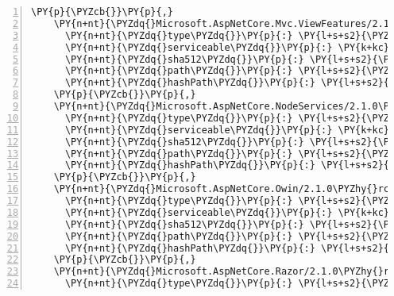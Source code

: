\begin{Verbatim}[commandchars=\\\{\},numbers=left,firstnumber=1,stepnumber=1,numberblanklines=0]
    \PY{p}{\PYZcb{}}\PY{p}{,}
    \PY{n+nt}{\PYZdq{}Microsoft.AspNetCore.Mvc.ViewFeatures/2.1.0\PYZhy{}rc1\PYZhy{}final\PYZdq{}}\PY{p}{:} \PY{p}{\PYZob{}}
      \PY{n+nt}{\PYZdq{}type\PYZdq{}}\PY{p}{:} \PY{l+s+s2}{\PYZdq{}package\PYZdq{}}\PY{p}{,}
      \PY{n+nt}{\PYZdq{}serviceable\PYZdq{}}\PY{p}{:} \PY{k+kc}{true}\PY{p}{,}
      \PY{n+nt}{\PYZdq{}sha512\PYZdq{}}\PY{p}{:} \PY{l+s+s2}{\PYZdq{}sha512\PYZhy{}f0Pb9qVStLdGgNNpw9O656mOPjgkfeUpaqJa4PLJow1Re+7l3ynFk3JoHuxg/epKdV0kpLyNPRS0TuCpg4vBJw==\PYZdq{}}\PY{p}{,}
      \PY{n+nt}{\PYZdq{}path\PYZdq{}}\PY{p}{:} \PY{l+s+s2}{\PYZdq{}microsoft.aspnetcore.mvc.viewfeatures/2.1.0\PYZhy{}rc1\PYZhy{}final\PYZdq{}}\PY{p}{,}
      \PY{n+nt}{\PYZdq{}hashPath\PYZdq{}}\PY{p}{:} \PY{l+s+s2}{\PYZdq{}microsoft.aspnetcore.mvc.viewfeatures.2.1.0\PYZhy{}rc1\PYZhy{}final.nupkg.sha512\PYZdq{}}
    \PY{p}{\PYZcb{}}\PY{p}{,}
    \PY{n+nt}{\PYZdq{}Microsoft.AspNetCore.NodeServices/2.1.0\PYZhy{}rc1\PYZhy{}final\PYZdq{}}\PY{p}{:} \PY{p}{\PYZob{}}
      \PY{n+nt}{\PYZdq{}type\PYZdq{}}\PY{p}{:} \PY{l+s+s2}{\PYZdq{}package\PYZdq{}}\PY{p}{,}
      \PY{n+nt}{\PYZdq{}serviceable\PYZdq{}}\PY{p}{:} \PY{k+kc}{true}\PY{p}{,}
      \PY{n+nt}{\PYZdq{}sha512\PYZdq{}}\PY{p}{:} \PY{l+s+s2}{\PYZdq{}sha512\PYZhy{}LQ5qqhHMYIRpZTx8ULKEvR3dudqJLaVF7OWc3RpGfuEjce1CShuALUGUQ2xbQsMJFmdYNU/ZNbDJjWxwQvax8Q==\PYZdq{}}\PY{p}{,}
      \PY{n+nt}{\PYZdq{}path\PYZdq{}}\PY{p}{:} \PY{l+s+s2}{\PYZdq{}microsoft.aspnetcore.nodeservices/2.1.0\PYZhy{}rc1\PYZhy{}final\PYZdq{}}\PY{p}{,}
      \PY{n+nt}{\PYZdq{}hashPath\PYZdq{}}\PY{p}{:} \PY{l+s+s2}{\PYZdq{}microsoft.aspnetcore.nodeservices.2.1.0\PYZhy{}rc1\PYZhy{}final.nupkg.sha512\PYZdq{}}
    \PY{p}{\PYZcb{}}\PY{p}{,}
    \PY{n+nt}{\PYZdq{}Microsoft.AspNetCore.Owin/2.1.0\PYZhy{}rc1\PYZhy{}final\PYZdq{}}\PY{p}{:} \PY{p}{\PYZob{}}
      \PY{n+nt}{\PYZdq{}type\PYZdq{}}\PY{p}{:} \PY{l+s+s2}{\PYZdq{}package\PYZdq{}}\PY{p}{,}
      \PY{n+nt}{\PYZdq{}serviceable\PYZdq{}}\PY{p}{:} \PY{k+kc}{true}\PY{p}{,}
      \PY{n+nt}{\PYZdq{}sha512\PYZdq{}}\PY{p}{:} \PY{l+s+s2}{\PYZdq{}sha512\PYZhy{}k/6tVIPDsaKv2J2f3MoOiOpzfXD729C7BIZHYs2qVV7Zts0zZ1msxG4+gLMeJIpoG5UL2eUOy7N7QVn0qgrZfg==\PYZdq{}}\PY{p}{,}
      \PY{n+nt}{\PYZdq{}path\PYZdq{}}\PY{p}{:} \PY{l+s+s2}{\PYZdq{}microsoft.aspnetcore.owin/2.1.0\PYZhy{}rc1\PYZhy{}final\PYZdq{}}\PY{p}{,}
      \PY{n+nt}{\PYZdq{}hashPath\PYZdq{}}\PY{p}{:} \PY{l+s+s2}{\PYZdq{}microsoft.aspnetcore.owin.2.1.0\PYZhy{}rc1\PYZhy{}final.nupkg.sha512\PYZdq{}}
    \PY{p}{\PYZcb{}}\PY{p}{,}
    \PY{n+nt}{\PYZdq{}Microsoft.AspNetCore.Razor/2.1.0\PYZhy{}rc1\PYZhy{}final\PYZdq{}}\PY{p}{:} \PY{p}{\PYZob{}}
      \PY{n+nt}{\PYZdq{}type\PYZdq{}}\PY{p}{:} \PY{l+s+s2}{\PYZdq{}package\PYZdq{}}\PY{p}{,}

\end{Verbatim}
